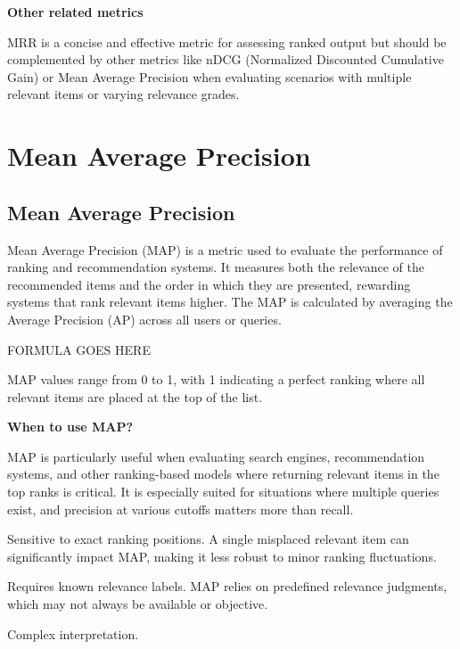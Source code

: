 \clearpage

\thispagestyle{customstyle}

\textbf{Other related metrics}

MRR is a concise and effective metric for assessing ranked output but should be complemented by other metrics like
nDCG (Normalized Discounted Cumulative Gain) or Mean Average Precision when evaluating scenarios with multiple relevant
items or varying relevance grades.


\clearpage
\thispagestyle{rankingstyle}
\section{Mean Average Precision}
\subsection{Mean Average Precision}

Mean Average Precision (MAP) is a metric used to evaluate the performance of ranking and recommendation systems. It measures
both the relevance of the recommended items and the order in which they are presented, rewarding systems that rank relevant
items higher. The MAP is calculated by averaging the Average Precision (AP) across all users or queries. 

\begin{center}
    FORMULA GOES HERE
\end{center}

MAP values range from 0 to 1, with 1 indicating a perfect ranking where all relevant items are placed at the top of the list.

\textbf{When to use MAP?}

MAP is particularly useful when evaluating search engines, recommendation systems, and other ranking-based models where
returning relevant items in the top ranks is critical. It is especially suited for situations where multiple queries exist,
and precision at various cutoffs matters more than recall.

{
    \item Sensitive to exact ranking positions. A single misplaced relevant item can significantly impact MAP, making it less
    robust to minor ranking fluctuations.
    \item Requires known relevance labels. MAP relies on predefined relevance judgments, which may not always be
    available or objective.
    \item Complex interpretation.

}

